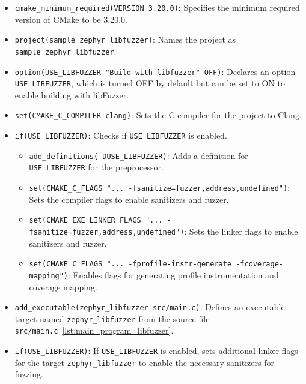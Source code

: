 \begin{itemize}
    \item \texttt{cmake\_minimum\_required(VERSION 3.20.0)}: Specifies the minimum required version of CMake to be 3.20.0.

    \item \texttt{project(sample\_zephyr\_libfuzzer)}: Names the project as \texttt{sample\_zephyr\_libfuzzer}.

    \item \texttt{option(USE\_LIBFUZZER "Build with libfuzzer" OFF)}: Declares an option \texttt{USE\_LIBFUZZER}, which is turned OFF by default but can be set to ON to enable building with libFuzzer.

    \item \texttt{set(CMAKE\_C\_COMPILER clang)}: Sets the C compiler for the project to Clang.

    \item \texttt{if(USE\_LIBFUZZER)}: Checks if \texttt{USE\_LIBFUZZER} is enabled.

    \begin{itemize}
        \item \texttt{add\_definitions(-DUSE\_LIBFUZZER)}: Adds a definition for \texttt{USE\_LIBFUZZER} for the preprocessor.

        \item \texttt{set(CMAKE\_C\_FLAGS "... -fsanitize=fuzzer,address,undefined")}: Sets the compiler flags to enable sanitizers and fuzzer.

        \item \texttt{set(CMAKE\_EXE\_LINKER\_FLAGS "... -fsanitize=fuzzer,address,undefined")}: Sets the linker flags to enable sanitizers and fuzzer.

        \item \texttt{set(CMAKE\_C\_FLAGS "... -fprofile-instr-generate -fcoverage-mapping")}: Enables flags for generating profile instrumentation and coverage mapping.
    \end{itemize}

    \item \texttt{add\_executable(zephyr\_libfuzzer src/main.c)}: Defines an executable target named \texttt{zephyr\_libfuzzer} from the source file \texttt{src/main.c}~\ref{lst:main_program_libfuzzer}.

    \item \texttt{if(USE\_LIBFUZZER)}: If \texttt{USE\_LIBFUZZER} is enabled, sets additional linker flags for the target \texttt{zephyr\_libfuzzer} to enable the necessary sanitizers for fuzzing.
\end{itemize}

